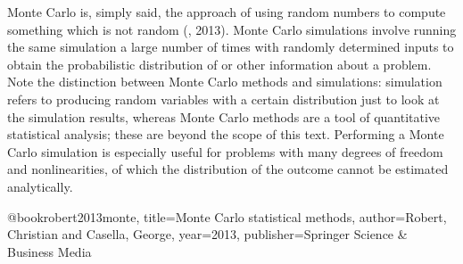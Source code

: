 Monte Carlo is, simply said, the approach of using random numbers to compute something which is not
random (\cite{robert2013monte}, 2013). Monte Carlo simulations involve running the same simulation a
large number of times with randomly determined inputs to obtain the probabilistic distribution of or
other information about a problem. Note the distinction between Monte Carlo methods and simulations:
simulation refers to producing random variables with a certain distribution just to look at the simulation results, whereas Monte Carlo methods are a tool of quantitative statistical analysis; these are beyond the scope of this text. Performing a Monte Carlo simulation is especially useful for problems with many degrees of freedom and nonlinearities, of which the distribution of the outcome cannot be estimated analytically.

 

@book{robert2013monte,
  title={Monte Carlo statistical methods},
  author={Robert, Christian and Casella, George},
  year={2013},
  publisher={Springer Science \& Business Media}
}